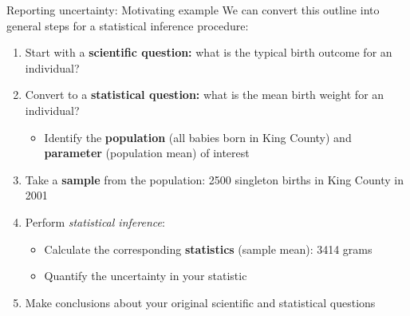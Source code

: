 \documentclass[10pt,t]{beamer}
\begin{document}
\begin{frame}{Reporting uncertainty: Motivating example}
We can convert this outline into general steps for a statistical inference procedure:

\vspace{0.3cm}

\begin{enumerate}
	\item Start with a \textbf{scientific question:} what is the typical birth outcome for an individual?
	\item Convert to a \textbf{statistical question:} what is the mean birth weight for an individual?
	\begin{itemize}
		\item Identify the \textbf{population} (all babies born in King County) and \textbf{parameter} (population mean) of interest
	\end{itemize}
	\item Take a \textbf{sample} from the population: 2500 singleton births in King County in 2001
	\item Perform \textit{statistical inference}:
	\begin{itemize}
		\item Calculate the corresponding \textbf{statistics} (sample mean): 3414 grams
		\item Quantify the uncertainty in your statistic
	\end{itemize}
	\item Make conclusions about your original scientific and statistical questions
\end{enumerate}
\end{frame}
\end{document}
